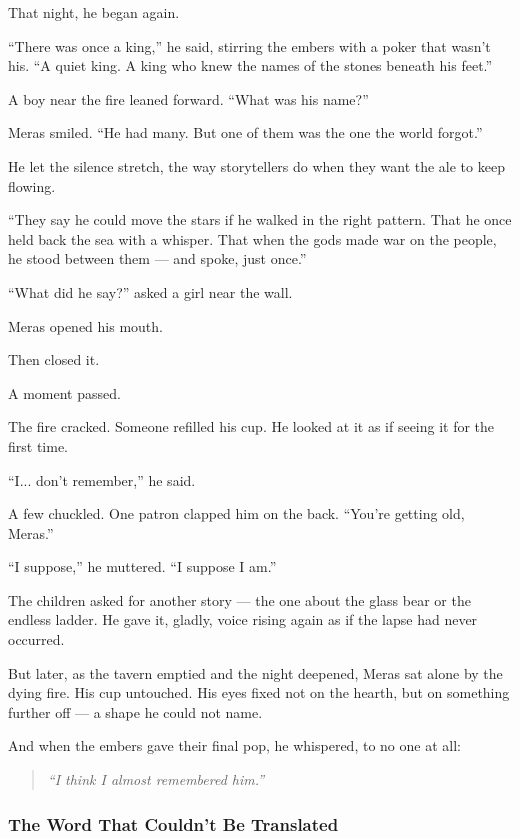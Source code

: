 \documentclass[12pt]{article}
\begin{document}
That night, he began again.

``There was once a king,'' he said, stirring the embers with a poker that wasn’t his. ``A quiet king. A king who knew the names of the stones beneath his feet.''

A boy near the fire leaned forward. ``What was his name?''

Meras smiled. ``He had many. But one of them was the one the world forgot.''

He let the silence stretch, the way storytellers do when they want the ale to keep flowing.

``They say he could move the stars if he walked in the right pattern. That he once held back the sea with a whisper. That when the gods made war on the people, he stood between them — and spoke, just once.''

``What did he say?'' asked a girl near the wall.

Meras opened his mouth.

Then closed it.

A moment passed.

The fire cracked. Someone refilled his cup. He looked at it as if seeing it for the first time.

``I... don’t remember,'' he said.

A few chuckled. One patron clapped him on the back. ``You’re getting old, Meras.''

``I suppose,'' he muttered. ``I suppose I am.''

The children asked for another story — the one about the glass bear or the endless ladder. He gave it, gladly, voice rising again as if the lapse had never occurred.

But later, as the tavern emptied and the night deepened, Meras sat alone by the dying fire. His cup untouched. His eyes fixed not on the hearth, but on something further off — a shape he could not name.

And when the embers gave their final pop, he whispered, to no one at all:

\begin{quote}
\emph{``I think I almost remembered him.''}
\end{quote}


\dotfill

\subsubsection*{The Word That Couldn’t Be Translated}
\end{document}
